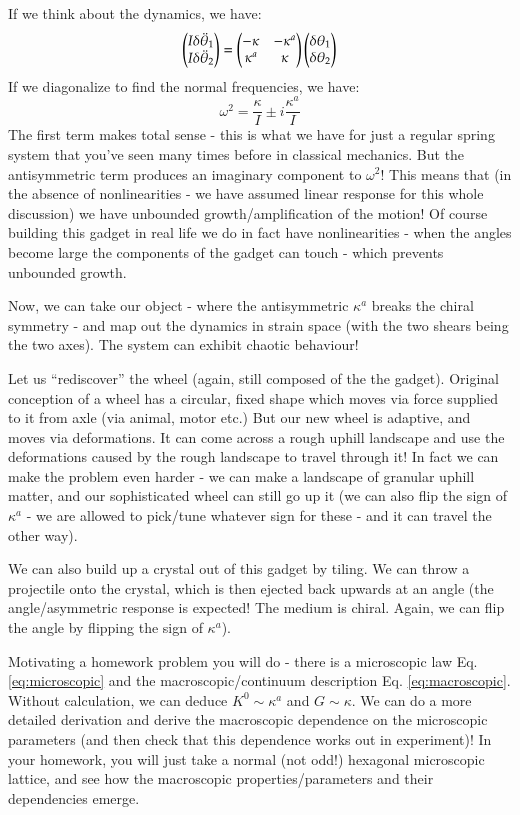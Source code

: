 If we think about the dynamics, we have:
\begin{equation}
    \begin{pmatrix}I\delta \ddot{\theta}_1 \\ I\delta \ddot{\theta}_2\end{pmatrix} = \begin{pmatrix}-\kappa & -\kappa^a \\ \kappa^a & \kappa\end{pmatrix}\begin{pmatrix}\delta \theta_1 \\ \delta\theta_2\end{pmatrix}
\end{equation}
If we diagonalize to find the normal frequencies, we have:
\begin{equation}
    \omega^2 = \frac{\kappa}{I} \pm i\frac{\kappa^a}{I}
\end{equation}
The first term makes total sense - this is what we have for just a regular spring system that you've seen many times before in classical mechanics. But the antisymmetric term produces an imaginary component to $\omega^2$! This means that (in the absence of nonlinearities - we have assumed linear response for this whole discussion) we have unbounded growth/amplification of the motion! Of course building this gadget in real life we do in fact have nonlinearities - when the angles become large the components of the gadget can touch - which prevents unbounded growth.

Now, we can take our object - where the antisymmetric $\kappa^a$ breaks the chiral symmetry - and map out the dynamics in strain space (with the two shears being the two axes). The system can exhibit chaotic behaviour!

Let us ``rediscover'' the wheel (again, still composed of the the gadget). Original conception of a wheel has a circular, fixed shape which moves via force supplied to it from axle (via animal, motor etc.) But our new wheel is adaptive, and moves via deformations. It can come across a rough uphill landscape and use the deformations caused by the rough landscape to travel through it! In fact we can make the problem even harder - we can make a landscape of granular uphill matter, and our sophisticated wheel can still go up it (we can also flip the sign of $\kappa^a$ - we are allowed to pick/tune whatever sign for these - and it can travel the other way).

We can also build up a crystal out of this gadget by tiling. We can throw a projectile onto the crystal, which is then ejected back upwards at an angle (the angle/asymmetric response is expected! The medium is chiral. Again, we can flip the angle by flipping the sign of $\kappa^a$).

Motivating a homework problem you will do - there is a microscopic law Eq. \eqref{eq:microscopic} and the macroscopic/continuum description Eq. \eqref{eq:macroscopic}. Without calculation, we can deduce $K^0 \sim \kappa^a$ and $G \sim \kappa$. We can do a more detailed derivation and derive the macroscopic dependence on the microscopic parameters (and then check that this dependence works out in experiment)! In your homework, you will just take a normal (not odd!) hexagonal microscopic lattice, and see how the macroscopic properties/parameters and their dependencies emerge.

